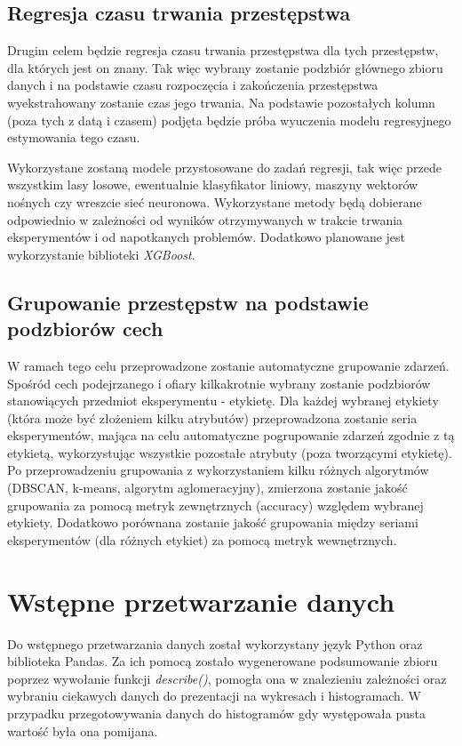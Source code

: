 \documentclass{classrep}
\begin{document}
{        \subsection{Regresja czasu trwania przestępstwa} \label{project_goal_2} {
            Drugim celem będzie regresja czasu trwania przestępstwa dla tych przestępstw, dla których jest on znany. Tak więc wybrany zostanie podzbiór głównego zbioru danych i na podstawie czasu rozpoczęcia i zakończenia przestępstwa wyekstrahowany zostanie czas jego trwania. Na podstawie pozostałych kolumn (poza tych z datą i czasem) podjęta będzie próba wyuczenia modelu regresyjnego estymowania tego czasu.
        
            Wykorzystane zostaną modele przystosowane do zadań regresji, tak więc przede wszystkim lasy losowe, ewentualnie klasyfikator liniowy, maszyny wektorów nośnych czy wreszcie sieć neuronowa. Wykorzystane metody będą dobierane odpowiednio w zależności od wyników otrzymywanych w trakcie trwania eksperymentów i od napotkanych problemów. Dodatkowo planowane jest wykorzystanie biblioteki \emph{XGBoost}.
        }
        
        \subsection{Grupowanie przestępstw na podstawie podzbiorów cech} \label{project_goal_3} {
            W ramach tego celu przeprowadzone zostanie automatyczne grupowanie zdarzeń. Spośród cech podejrzanego i ofiary kilkakrotnie wybrany zostanie podzbiorów stanowiących przedmiot eksperymentu - etykietę. Dla każdej wybranej etykiety (która może być złożeniem kilku atrybutów) przeprowadzona zostanie seria eksperymentów, mająca na celu automatyczne pogrupowanie zdarzeń zgodnie z tą etykietą, wykorzystując wszystkie pozostałe atrybuty (poza tworzącymi etykietę). Po przeprowadzeniu grupowania z wykorzystaniem kilku różnych algorytmów (DBSCAN, k-means, algorytm aglomeracyjny), zmierzona zostanie jakość grupowania za pomocą metryk zewnętrznych (accuracy) względem wybranej etykiety. Dodatkowo porównana zostanie jakość grupowania między seriami eksperymentów (dla różnych etykiet) za pomocą metryk wewnętrznych.
        }

    }

    \section{Wstępne przetwarzanie danych} {
        Do wstępnego przetwarzania danych został wykorzystany język Python oraz biblioteka Pandas. Za ich pomocą zostało wygenerowane podsumowanie zbioru poprzez wywołanie funkcji \emph{describe()}, pomogła ona w znalezieniu zależności oraz wybraniu ciekawych danych do prezentacji na wykresach i histogramach. W przypadku przegotowywania danych do histogramów gdy występowała pusta wartość była ona pomijana. 
    }

    \begin{thebibliography}{0}
    \end{thebibliography}
\end{document}
